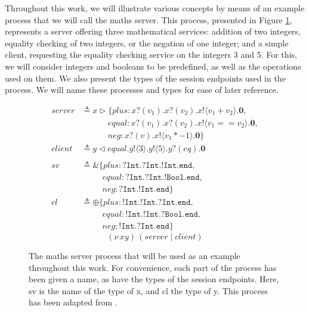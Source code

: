 \documentclass{l4proj}
\begin{document}
\quad Throughout this work, we will illustrate various concepts by means of an example process that we will call the maths server. This process, presented in Figure \ref{fig:exampleProc}, represents a server offering three mathematical services: addition of two integers, equality checking of two integers, or the negation of one integer; and a simple client, requesting the equality checking service on the integers 3 and 5. For this, we will consider integers and booleans to be predefined, as well as the operations used on them. We also present the types of the session endpoints used in the process. We will name these processes and types for ease of later reference.

\begin{figure}[H]
\begin{align*}
server &\triangleq x \triangleright \{plus : x\texttt{?}(v_{1}).x\texttt{?}(v_{2}).x\texttt{!}\langle v_{1} + v_{2} \rangle.\textbf{0}, \\
& \qquad \quad \, equal : x\texttt{?}(v_{1}).x\texttt{?}(v_{2}).x\texttt{!}\langle v_{1} == v_{2} \rangle.\textbf{0}, \\
& \qquad \quad \, neg : x\texttt{?}(v).x\texttt{!}\langle v_{1} * -1 \rangle.\textbf{0} \} \\
client &\triangleq y \triangleleft equal.y\texttt{!}\langle 3 \rangle.y\texttt{!}\langle 5 \rangle.y\texttt{?}(eq).\textbf{0} \\
{} \\
sv &\triangleq \&\{ plus :  \texttt{?Int}.\texttt{?Int}.\texttt{!Int}.\texttt{end}, \\
& \qquad \,\,\, equal : \texttt{?Int}.\texttt{?Int}.\texttt{!Bool}.\texttt{end}, \\
& \qquad \,\,\, neg : \texttt{?Int}.\texttt{!Int}.\texttt{end} \} \\
cl &\triangleq \oplus\{ plus :  \texttt{!Int}.\texttt{!Int}.\texttt{?Int}.\texttt{end}, \\
& \qquad \,\,\, equal : \texttt{!Int}.\texttt{!Int}.\texttt{?Bool}.\texttt{end}, \\
& \qquad \,\,\, neg : \texttt{!Int}.\texttt{?Int}.\texttt{end} \}
\end{align*}
\[(\nu\,xy)\,(server \mid client)\]
\caption{The maths server process that will be used as an example throughout this work. For convenience, each part of the process has been given a name, as have the types of the session endpoints. Here, sv is the name of the type of x, and cl the type of y. This process has been adapted from \citet{DARDHA2017253}.}
\label{fig:exampleProc}
\end{figure}
\end{document}
